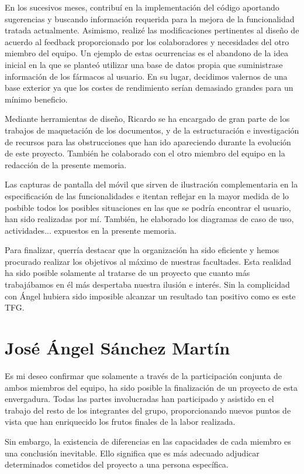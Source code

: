 \documentclass[11pt,spanish,
		listoftables,listoffigures]
		{tfgplantilla}
\begin{document}
En los sucesivos meses, contribuí en la implementación del código aportando sugerencias y buscando información requerida para la mejora de la funcionalidad tratada actualmente.
Asimismo, realizé las modificaciones pertinentes al diseño de acuerdo al feedback proporcionado por los colaboradores y necesidades del otro miembro del equipo. Un ejemplo de estas ocurrencias es el abandono de la idea inicial en la que se planteó utilizar una base de datos propia que suministrase información de los fármacos al usuario. En su lugar, decidimos valernos de una base exterior ya que los costes de rendimiento serían demasiado grandes para un mínimo beneficio.

Mediante herramientas de diseño, Ricardo se ha encargado de gran parte de los trabajos de maquetación de los documentos, y de la estructuración e investigación de recursos para las obstrucciones que han ido apareciendo durante la evolución de este proyecto. También he colaborado con el otro miembro del equipo en la redacción de la presente memoria.

Las capturas de pantalla del móvil que sirven de ilustración complementaria en la especificación de las funcionalidades e itentan reflejar en la mayor medida de lo posbible todos los posibles situaciones en las que se podría encontrar el usuario, han sido realizadas por mí. También, he elaborado los diagramas de caso de uso, actividades... expuestos en la presente memoria.

Para finalizar, querría destacar que la organización ha sido eficiente y hemos procurado realizar los objetivos al máximo de nuestras facultades. Esta realidad ha sido posible solamente al tratarse de un proyecto que cuanto más trabajábamos en él más despertaba nuestra ilusión e interés. Sin la complicidad con Ángel hubiera sido imposible alcanzar un resultado tan positivo como es este TFG. 
 
\newpage
\section{José Ángel Sánchez Martín}
Es mi deseo confirmar que solamente a través de la participación conjunta de ambos miembros del equipo, ha sido posible la finalización de un proyecto de esta envergadura.
Todas las partes involucradas han participado y asistido en el trabajo del resto de los integrantes del grupo, proporcionando nuevos puntos de vista que han enriquecido los frutos finales de la labor realizada.

Sin embargo, la existencia de diferencias en las capacidades de cada miembro es una conclusión inevitable. Ello significa que es más adecuado adjudicar determinados cometidos del proyecto a una persona específica.
\end{document}
